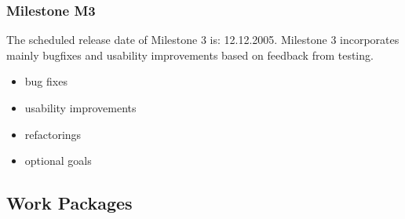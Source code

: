 \documentclass[11pt,a4paper]{article}
\begin{document}
\subsubsection{Milestone M3}

The scheduled release date of Milestone 3 is: 12.12.2005. Milestone 3 incorporates mainly bugfixes and
usability improvements based on feedback from testing.

\begin{itemize}
 \item bug fixes
 \item usability improvements
 \item refactorings
 \item optional goals
\end{itemize}

\newpage
\subsection{Work Packages}


%
%
\end{document}
